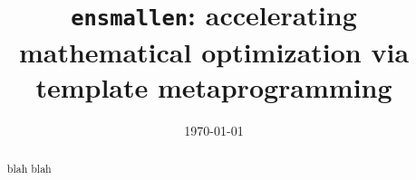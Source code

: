 \documentclass[10pt]{article}
\title{{\tt ensmallen}: accelerating mathematical optimization via template metaprogramming}
\date{\today}
\begin{document}
\maketitle

\begin{abstract}
blah blah
\end{abstract}








\end{document}
